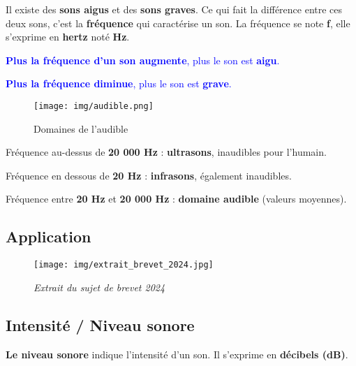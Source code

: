 \documentclass[a4paper,12pt]{article}
\begin{document}
Il existe des \textbf{sons aigus} et des \textbf{sons graves}.  
Ce qui fait la différence entre ces deux sons, c’est la \textbf{fréquence} qui caractérise un son.  
La fréquence se note \textbf{f}, elle s’exprime en \textbf{hertz} noté \textbf{Hz}.  

\vspace{1em}

\begin{compactitem}
\item \textcolor{blue}{\textbf{Plus la fréquence d’un son augmente}, plus le son est \textbf{aigu}.}  
\item \textcolor{blue}{\textbf{Plus la fréquence diminue}, plus le son est \textbf{grave}.}
\end{compactitem}

\vspace{1em}

\begin{figure}[H]
  \centering
  \texttt{[image: img/audible.png]}
  \captionsetup{labelformat=empty}
  \caption{\label{} Domaines de l'audible}
\end{figure}

\begin{compactitem}
  \item Fréquence au-dessus de \textbf{20 000 Hz} : \textbf{ultrasons}, inaudibles pour l’humain.
  \item Fréquence en dessous de \textbf{20 Hz} : \textbf{infrasons}, également inaudibles.
  \item Fréquence entre \textbf{20 Hz} et \textbf{20 000 Hz} : \textbf{domaine audible} (valeurs moyennes).
\end{compactitem}

\subsection*{Application}

\begin{figure}[H]
  \centering
  \texttt{[image: img/extrait\_brevet\_2024.jpg]}
  \captionsetup{labelformat=empty}
  \caption{\label{} \textit{Extrait du sujet de brevet 2024}}
\end{figure}


\subsection*{Intensité / Niveau sonore}

\textbf{Le niveau sonore} indique l’intensité d’un son. Il s’exprime en \textbf{décibels (dB)}.
\end{document}
